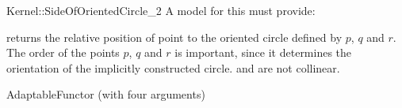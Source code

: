 \begin{ccRefFunctionObjectConcept}{Kernel::SideOfOrientedCircle_2}
A model for this must provide:


         {returns the relative position of point 
          to the oriented circle defined by $p$, $q$ and $r$.
          The order of the points $p$, $q$ and $r$ is important,
          since it determines the orientation of the implicitly
          constructed circle.
          \ccPrecond {} and  are not collinear.}

\ccRefines
AdaptableFunctor (with four arguments)

\ccSeeAlso
{} \\


\end{ccRefFunctionObjectConcept}
